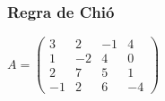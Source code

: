 \documentclass[pdftex, brazil, aspectratio=169]{beamer}
\begin{document}
\begin{frame}[t]
  \frametitle{Regra de Chió}
  $A = \begin{pmatrix}
    3 & 2 & -1 & 4\\
    1 & -2 & 4 & 0\\
    2 & 7 & 5 & 1\\
    -1 & 2 & 6 & -4\end{pmatrix}$
\end{frame}




\end{document}
